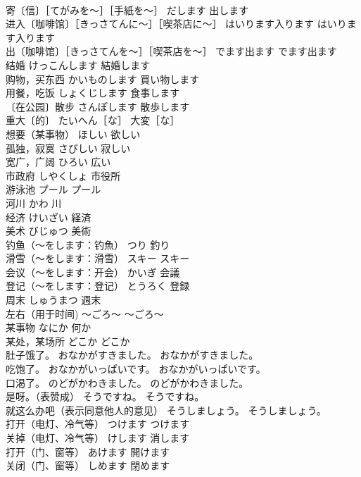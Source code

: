 \documentclass[8pt]{extreport}
\begin{document}
\begin{CJK}{UTF8}{min}
\\	寄〔信〕［てがみを～］［手紙を～］	だします	出します
\\	进入〔咖啡馆〕［きっさてんに～］［喫茶店に～］	はいります入ります	はいります入ります
\\	出〔咖啡馆〕［きっさてんを～］［喫茶店を～］	でます出ます	でます出ます
\\	结婚	けっこんします	結婚します
\\	购物，买东西	かいものします	買い物します
\\	用餐，吃饭	しょくじします	食事します
\\	〔在公园〕散步	さんぽします	散歩します
\\	重大〔的〕	たいへん［な］	大変［な］
\\	想要（某事物）	ほしい	欲しい
\\	孤独，寂寞	さびしい	寂しい
\\	宽广，广阔	ひろい	広い
\\	市政府	しやくしょ	市役所
\\	游泳池	プール	プール
\\	河川	かわ	川
\\	经济	けいざい	経済
\\	美术	びじゅつ	美術
\\	钓鱼（～をします：钓魚）	つり	釣り
\\	滑雪（～をします：滑雪）	スキー	スキー
\\	会议（～をします：开会）	かいぎ	会議
\\	登记（～をします：登记）	とうろく	登録
\\	周末	しゅうまつ	週末
\\	左右（用于时间)	～ごろ～	～ごろ～
\\	某事物	なにか	何か
\\	某处，某场所	どこか	どこか
\\	肚子饿了。	おなかがすきました。	おなかがすきました。
\\	吃饱了。	おなかがいっぱいです。	おなかがいっぱいです。
\\	口渴了。	のどがかわきました。	のどがかわきました。
\\	是呀。（表赞成）	そうですね。	そうですね。
\\	就这么办吧（表示同意他人的意见）	そうしましょう。	そうしましょう。
\\	打开（电灯、冷气等）	つけます	つけます
\\	关掉（电灯、冷气等）	けします	消します
\\	打开（门、窗等）	あけます	開けます
\\	关闭（门、窗等）	しめます	閉めます

\end{CJK}
\end{document}
